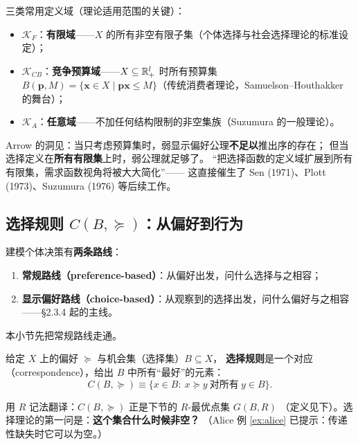 三类常用定义域（理论适用范围的关键）：
\begin{itemize}
  \item $\mathcal{K}_F$：\textbf{有限域}——$X$ 的所有非空有限子集（个体选择与社会选择理论的标准设定）；
  \item $\mathcal{K}_{CB}$：\textbf{竞争预算域}——$X\subseteq\mathbb{R}_+^l$ 时所有预算集
  $B(\boldsymbol{p},M)=\{\boldsymbol{x}\in X\mid \boldsymbol{p}\boldsymbol{x}\le M\}$（传统消费者理论，Samuelson--Houthakker 的舞台）；
  \item $\mathcal{K}_A$：\textbf{任意域}——不加任何结构限制的非空集族（Suzumura 的一般理论）。
\end{itemize}

\begin{remark}
Arrow 的洞见：当只考虑预算集时，弱显示偏好公理\textbf{不足以}推出序的存在；
但当选择定义在\textbf{所有有限集}上时，弱公理就足够了。
“把选择函数的定义域扩展到所有有限集，需求函数视角将被大大简化”——
这直接催生了 Sen (1971)、Plott (1973)、Suzumura (1976) 等后续工作。
\end{remark}

\subsection{\texorpdfstring{选择规则 $C(B,\succeq)$}{选择规则 C(B,≽)}：从偏好到行为}

建模个体决策有\textbf{两条路线}：
\begin{enumerate}
  \item \textbf{常规路线（preference-based）}：从偏好出发，问什么选择与之相容；
  \item \textbf{显示偏好路线（choice-based）}：从观察到的选择出发，问什么偏好与之相容
  ——§2.3.4 起的主线。
\end{enumerate}
本小节先把常规路线走通。

\begin{definition}[选择规则]\label{def:choicerule}
给定 $X$ 上的偏好 $\succeq$ 与机会集（选择集）$B\subseteq X$，
\textbf{选择规则}是一个对应（correspondence），给出 $B$ 中所有“最好”的元素：
\begin{equation}
C(B,\succeq)\equiv\{x\in B:\ x\succeq y\ \text{对所有}\ y\in B\}. \label{eq:CB}
\end{equation}
\end{definition}

用 $R$ 记法翻译：$C(B,\succeq)$ 正是下节的 $R$-最优点集 $G(B,R)$
（定义见下）。选择理论的第一问是：\textbf{这个集合什么时候非空？}
（Alice 例 \ref{ex:alice} 已提示：传递性缺失时它可以为空。）

